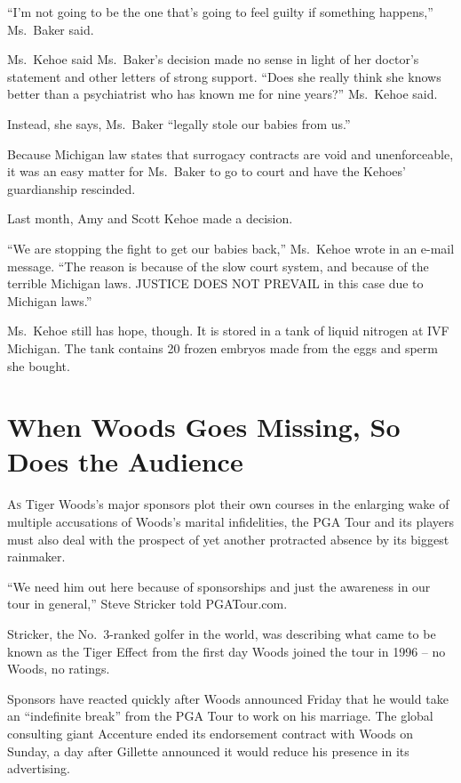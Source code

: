 ﻿\documentclass[12pt]{article}
\begin{document}
``I'm not going to be the one that's going to feel guilty if something happens,'' Ms.~Baker said.

Ms.~Kehoe said Ms.~Baker's decision made no sense in light of her doctor's statement and other
letters of strong support. ``Does she really think she knows better than a psychiatrist who has
known me for nine years?'' Ms.~Kehoe said.

Instead, she says, Ms.~Baker ``legally stole our babies from us.''

Because Michigan law states that surrogacy contracts are void and unenforceable, it was an easy
matter for Ms.~Baker to go to court and have the Kehoes' guardianship rescinded.

Last month, Amy and Scott Kehoe made a decision.

``We are stopping the fight to get our babies back,'' Ms.~Kehoe wrote in an e-mail message. ``The
reason is because of the slow court system, and because of the terrible Michigan laws. JUSTICE DOES
NOT PREVAIL in this case due to Michigan laws.''

Ms.~Kehoe still has hope, though. It is stored in a tank of liquid nitrogen at IVF Michigan. The
tank contains 20 frozen embryos made from the eggs and sperm she bought.

\section{When Woods Goes Missing, So Does the Audience}

\lettrine{A}{s} Tiger Woods's major sponsors plot their own courses in the
enlarging wake of multiple accusations of Woods's marital infidelities, the PGA Tour and its players
must also deal with the prospect of yet another protracted absence by its biggest rainmaker.

``We need him out here because of sponsorships and just the awareness in our tour in general,''
Steve Stricker told PGATour.com.

Stricker, the No.~3-ranked golfer in the world, was describing what came to be known as the Tiger
Effect from the first day Woods joined the tour in 1996 -- no Woods, no ratings.

Sponsors have reacted quickly after Woods announced Friday that he would take an ``indefinite
break'' from the PGA Tour to work on his marriage. The global consulting giant Accenture ended its
endorsement contract with Woods on Sunday, a day after Gillette announced it would reduce his
presence in its advertising.
\end{document}
